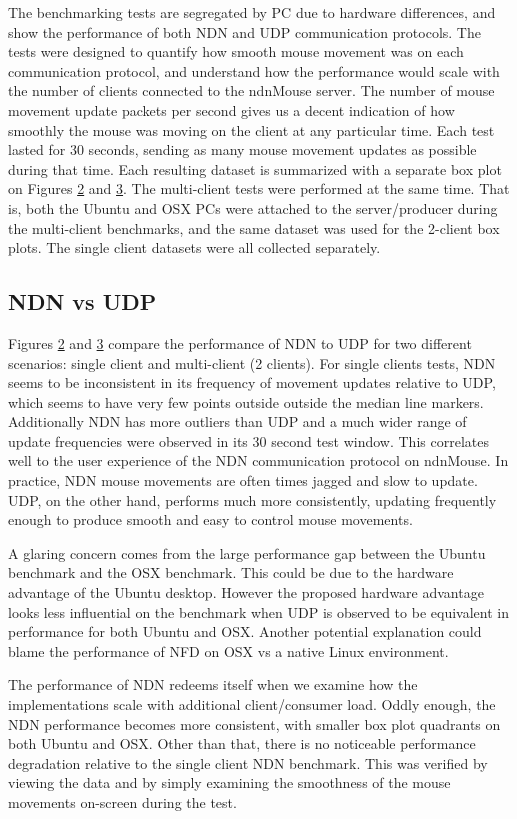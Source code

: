 \documentclass{sig-alternate}
\renewcommand\_{\textunderscore\allowbreak}  %
\begin{document}
The benchmarking tests are segregated by PC due to hardware differences, and show the performance of both NDN and UDP communication protocols. The tests were designed to quantify how smooth mouse movement was on each communication protocol, and understand how the performance would scale with the number of clients connected to the ndnMouse server. The number of mouse movement update packets per second gives us a decent indication of how smoothly the mouse was moving on the client at any particular time. Each test lasted for 30 seconds, sending as many mouse movement updates as possible during that time. Each resulting dataset is summarized with a separate box plot on Figures \hyperlink{fig:ubuntuBenchmark}{2} and \hyperlink{fig:osxBenchmark}{3}. The multi-client tests were performed at the same time. That is, both the Ubuntu and OSX PCs were attached to the server/producer during the multi-client benchmarks, and the same dataset was used for the 2-client box plots. The single client datasets were all collected separately.

\subsection{NDN vs UDP}
Figures \hyperlink{fig:ubuntuBenchmark}{2} and \hyperlink{fig:osxBenchmark}{3} compare the performance of NDN to UDP for two different scenarios: single client and multi-client (2 clients). For single clients tests, NDN seems to be inconsistent in its frequency of movement updates relative to UDP, which seems to have very few points outside outside the median line markers. Additionally NDN has more outliers than UDP and a much wider range of update frequencies were observed in its 30 second test window. This correlates well to the user experience of the NDN communication protocol on ndnMouse. In practice, NDN mouse movements are often times jagged and slow to update. UDP, on the other hand, performs much more consistently, updating frequently enough to produce smooth and easy to control mouse movements.

A glaring concern comes from the large performance gap between the Ubuntu benchmark and the OSX benchmark. This could be due to the hardware advantage of the Ubuntu desktop. However the proposed hardware advantage looks less influential on the benchmark when UDP is observed to be equivalent in performance for both Ubuntu and OSX. Another potential explanation could blame the performance of NFD on OSX vs a native Linux environment.

The performance of NDN redeems itself when we examine how the implementations scale with additional client/consumer load. Oddly enough, the NDN performance becomes more consistent, with smaller box plot quadrants on both Ubuntu and OSX. Other than that, there is no noticeable performance degradation relative to the single client NDN benchmark. This was verified by viewing the data and by simply examining the smoothness of the mouse movements on-screen during the test.
\end{document}
